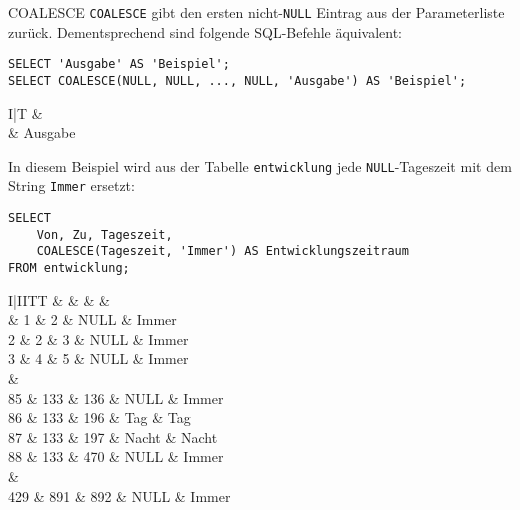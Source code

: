 \begin{sql}{COALESCE}
    \texttt{COALESCE} gibt den ersten nicht-\texttt{NULL} Eintrag aus der Parameterliste zurück.
    Dementsprechend sind folgende SQL-Befehle äquivalent:

    \begin{verbatim}
SELECT 'Ausgabe' AS 'Beispiel';
SELECT COALESCE(NULL, NULL, ..., NULL, 'Ausgabe') AS 'Beispiel';
    \end{verbatim}

    \begin{tabular}{I|T}
        &  \\ & Ausgabe \\
    \end{tabular}

    In diesem Beispiel wird aus der Tabelle \texttt{entwicklung} jede \texttt{NULL}-Tageszeit mit dem String \texttt{Immer} ersetzt:

    \begin{verbatim}
SELECT
    Von, Zu, Tageszeit,
    COALESCE(Tageszeit, 'Immer') AS Entwicklungszeitraum
FROM entwicklung;
    \end{verbatim}

    \begin{tabular}{I|IITT}
        &  &  &  &  \\ & 1 & 2 & NULL & Immer \\
        2 & 2 & 3 & NULL & Immer \\
        3 & 4 & 5 & NULL & Immer \\
         &  \\
        85 & 133 & 136 & NULL & Immer \\
        86 & 133 & 196 & Tag & Tag \\
        87 & 133 & 197 & Nacht & Nacht \\
        88 & 133 & 470 & NULL & Immer \\
         &  \\
        429 & 891 & 892 & NULL & Immer \\
    \end{tabular}
\end{sql}

